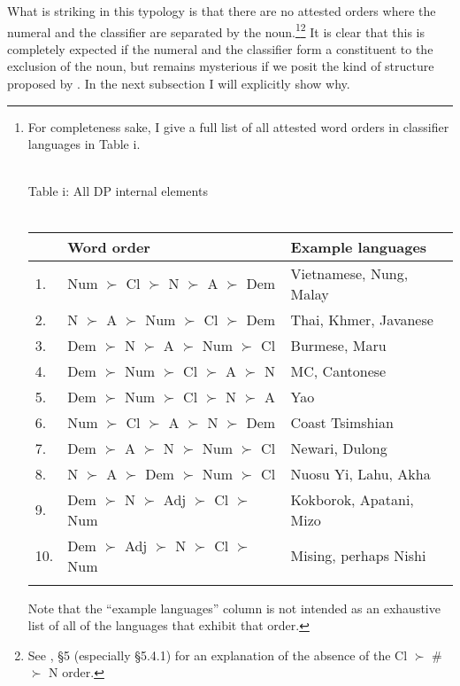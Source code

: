 \documentclass[output=paper
,modfonts
,nonflat]{langsci/langscibook}
\begin{document}
What is striking in this typology is that there are no attested orders where the numeral and the classifier are separated by the noun.\footnote{For completeness sake, I give a full list of all attested word orders in classifier languages in Table i. \vspace{-0.3cm}	

{\centering 
~\\
	Table i: All DP internal elements\\
~\\
\hspace{0.10\textwidth} \begin{tabularx}{0.75\textwidth}{lXX}
	\lsptoprule
	&Word order&Example languages\\
	\midrule
	1.&Num $\succ$ Cl $\succ$ N $\succ$ A $\succ$ Dem& {Vietnamese}, {Nung}, {Malay}\\
	2.&N $\succ$ A $\succ$ Num $\succ$ Cl $\succ$ Dem& {Thai}, {Khmer}, {Javanese}\\
	3.&Dem $\succ$ N $\succ$ A $\succ$ Num $\succ$ Cl& {Burmese}, {Maru}\\
	4.&Dem $\succ$ Num $\succ$ Cl $\succ$ A $\succ$ N& MC, {Cantonese}\\
	5.&Dem $\succ$ Num $\succ$ Cl $\succ$ N $\succ$ A& {Yao}\\
	6.&Num $\succ$ Cl $\succ$ A $\succ$ N $\succ$ Dem& {Coast Tsimshian}\\
	7.&Dem $\succ$ A $\succ$ N $\succ$ Num $\succ$ Cl&{Newari}, {Dulong}\\
	8.&N $\succ$ A $\succ$ Dem $\succ$ Num $\succ$ Cl& {Nuosu Yi}, {Lahu}, Akha\\
	9.&Dem $\succ$ N $\succ$ Adj $\succ$ Cl $\succ$ Num & {Kokborok}, Apatani, {Mizo}\\
	10.&Dem $\succ$ Adj $\succ$ N $\succ$ Cl $\succ$ Num & {Mising}, perhaps {Nishi}\\ 
	\lspbottomrule
\end{tabularx}} \vspace{0.2cm}

Note that the ``example languages'' column is not intended as an exhaustive list of all of the languages that exhibit that order.}\tss{,}\footnote{See \citet{Hall2015}, \S5 (especially \S5.4.1) for an explanation of the absence of the Cl $\succ$ \# $\succ$ N order.} It is clear that this is completely expected if the numeral and the classifier form a constituent to the exclusion of the noun, but remains mysterious if we posit the kind of structure proposed by \citet{Simpson2005}. In the next subsection I will explicitly show why.
\end{document}
